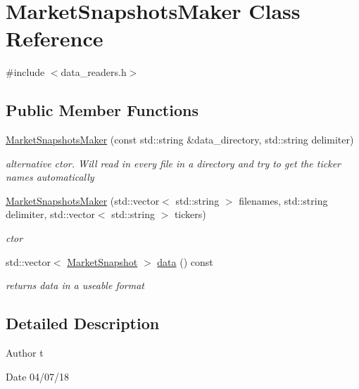 \hypertarget{classMarketSnapshotsMaker}{}\section{Market\+Snapshots\+Maker Class Reference}
\label{classMarketSnapshotsMaker}


{\ttfamily \#include $<$data\+\_\+readers.\+h$>$}

\subsection*{Public Member Functions}
\begin{DoxyCompactItemize}
\item 
\hyperlink{classMarketSnapshotsMaker_a54050922d3dd9f554a5d3e4137e1963c}{Market\+Snapshots\+Maker} (const std\+::string \&data\+\_\+directory, std\+::string delimiter)
\begin{DoxyCompactList}\small\item\em alternative ctor. Will read in every file in a directory and try to get the ticker names automatically \end{DoxyCompactList}\item 
\hyperlink{classMarketSnapshotsMaker_a8107a3b92c32118a667b5e86099ecde8}{Market\+Snapshots\+Maker} (std\+::vector$<$ std\+::string $>$ filenames, std\+::string delimiter, std\+::vector$<$ std\+::string $>$ tickers)
\begin{DoxyCompactList}\small\item\em ctor \end{DoxyCompactList}\item 
std\+::vector$<$ \hyperlink{classMarketSnapshot}{Market\+Snapshot} $>$ \hyperlink{classMarketSnapshotsMaker_a1fbc9bc9f9e8c6bb1641211b027f7b0d}{data} () const
\begin{DoxyCompactList}\small\item\em returns data in a useable format \end{DoxyCompactList}\end{DoxyCompactItemize}


\subsection{Detailed Description}
\begin{DoxyAuthor}{Author}
t 
\end{DoxyAuthor}
\begin{DoxyDate}{Date}
04/07/18 
\end{DoxyDate}


